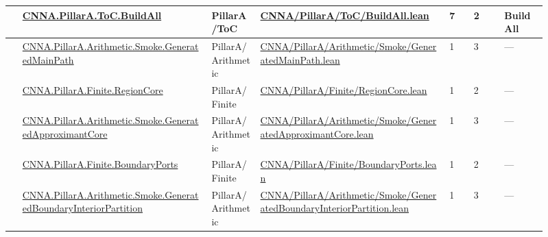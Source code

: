 \begin{longtable}{L{0.025\linewidth} L{0.315\linewidth} L{0.08\linewidth} L{0.315\linewidth} L{0.045\linewidth} L{0.055\linewidth} L{0.07\linewidth}}
\hline
{} & \href{run:repo_snapshot/CNNA/PillarA/ToC/BuildAll.lean}{CNNA.\allowbreak{}PillarA.\allowbreak{}ToC.\allowbreak{}BuildAll} & PillarA/\allowbreak{}ToC & \href{run:repo_snapshot/CNNA/PillarA/ToC/BuildAll.lean}{CNNA/\allowbreak{}PillarA/\allowbreak{}ToC/\allowbreak{}BuildAll.\allowbreak{}lean} & 7 & 2 & BuildAll\\
\hline
{} & \href{run:repo_snapshot/CNNA/PillarA/Arithmetic/Smoke/GeneratedMainPath.lean}{CNNA.\allowbreak{}PillarA.\allowbreak{}Arithmetic.\allowbreak{}Smoke.\allowbreak{}GeneratedMainPath} & PillarA/\allowbreak{}Arithmetic & \href{run:repo_snapshot/CNNA/PillarA/Arithmetic/Smoke/GeneratedMainPath.lean}{CNNA/\allowbreak{}PillarA/\allowbreak{}Arithmetic/\allowbreak{}Smoke/\allowbreak{}GeneratedMainPath.\allowbreak{}lean} & 1 & 3 & ---\\
\hline
{} & \href{run:repo_snapshot/CNNA/PillarA/Finite/RegionCore.lean}{CNNA.\allowbreak{}PillarA.\allowbreak{}Finite.\allowbreak{}RegionCore} & PillarA/\allowbreak{}Finite & \href{run:repo_snapshot/CNNA/PillarA/Finite/RegionCore.lean}{CNNA/\allowbreak{}PillarA/\allowbreak{}Finite/\allowbreak{}RegionCore.\allowbreak{}lean} & 1 & 2 & ---\\
\hline
{} & \href{run:repo_snapshot/CNNA/PillarA/Arithmetic/Smoke/GeneratedApproximantCore.lean}{CNNA.\allowbreak{}PillarA.\allowbreak{}Arithmetic.\allowbreak{}Smoke.\allowbreak{}GeneratedApproximantCore} & PillarA/\allowbreak{}Arithmetic & \href{run:repo_snapshot/CNNA/PillarA/Arithmetic/Smoke/GeneratedApproximantCore.lean}{CNNA/\allowbreak{}PillarA/\allowbreak{}Arithmetic/\allowbreak{}Smoke/\allowbreak{}GeneratedApproximantCore.\allowbreak{}lean} & 1 & 3 & ---\\
\hline
{} & \href{run:repo_snapshot/CNNA/PillarA/Finite/BoundaryPorts.lean}{CNNA.\allowbreak{}PillarA.\allowbreak{}Finite.\allowbreak{}BoundaryPorts} & PillarA/\allowbreak{}Finite & \href{run:repo_snapshot/CNNA/PillarA/Finite/BoundaryPorts.lean}{CNNA/\allowbreak{}PillarA/\allowbreak{}Finite/\allowbreak{}BoundaryPorts.\allowbreak{}lean} & 1 & 2 & ---\\
\hline
{} & \href{run:repo_snapshot/CNNA/PillarA/Arithmetic/Smoke/GeneratedBoundaryInteriorPartition.lean}{CNNA.\allowbreak{}PillarA.\allowbreak{}Arithmetic.\allowbreak{}Smoke.\allowbreak{}GeneratedBoundaryInteriorPartition} & PillarA/\allowbreak{}Arithmetic & \href{run:repo_snapshot/CNNA/PillarA/Arithmetic/Smoke/GeneratedBoundaryInteriorPartition.lean}{CNNA/\allowbreak{}PillarA/\allowbreak{}Arithmetic/\allowbreak{}Smoke/\allowbreak{}GeneratedBoundaryInteriorPartition.\allowbreak{}lean} & 1 & 3 & ---\\

\end{longtable}
